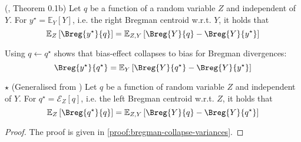 \documentclass[../main.tex]{subfiles}
\begin{document}

\begin{lemma} \label{thm:bregman-collapse-bias} (\cite{pfau_GeneralizedBiasVarianceDecomposition_}, Theorem 0.1b)
    Let $q$ be a function of a random variable $Z$ and independent of $Y$. For $y^\star = \mathbb{E}_{Y}\left[ Y \right]$, i.e. the right Bregman centroid w.r.t. $Y$, it holds that
$$
\mathbb{E}_{Z}\left[ \Breg{y^\star}{q} \right]  = \mathbb{E}_{Z,Y}\left[ \Breg{Y}{q} - \Breg{Y}{y^\star} \right] 
$$
\end{lemma}

Using $q \gets q^\star$ shows that bias-effect collapses to bias for Bregman divergences: 
$$\Breg{y^\star}{q^\star} = \mathbb{E}_{Y}\left[ \Breg{Y}{q^\star} - \Breg{Y}{y^\star} \right]$$

\begin{lemma} \label{thm:bregman-collapse-variances}$\star$ (Generalised from \cite{wood_UnifiedTheoryDiversity_2023})
Let $q$ be a function of random variable $Z$ and independent of $Y$. For $q^\star = \mathcal{E}_{Z}\left[ q \right]$, i.e. the left Bregman centroid w.r.t. $Z$, it holds that
$$
\mathbb{E}_{Z}\left[ \Breg{q^\star}{q} \right] 
 = \mathbb{E}_{Z,Y}\left[ \Breg{Y}{q} - \Breg{Y}{q^\star} \right] 
$$
\end{lemma}
\begin{proof}
The proof is given in \cref{proof:bregman-collapse-variances}.
\end{proof}
\end{document}
